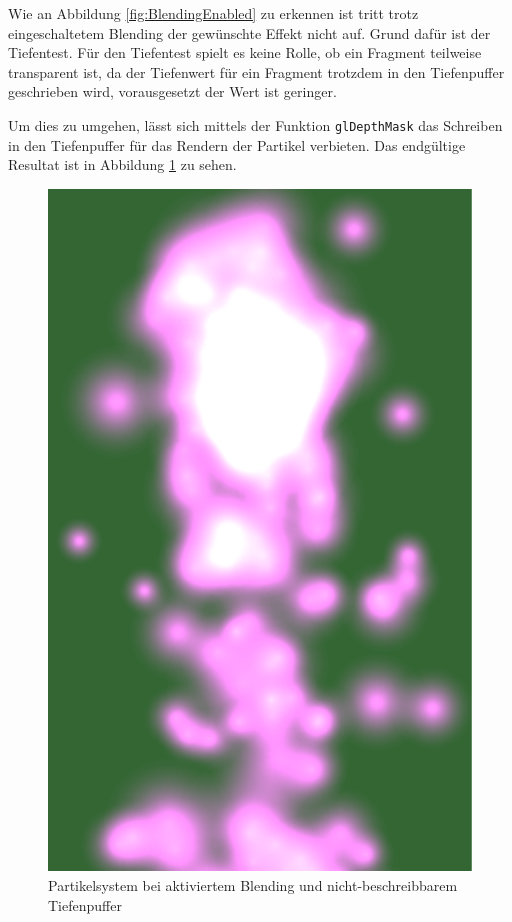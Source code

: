 Wie an Abbildung \ref{fig:BlendingEnabled} zu erkennen ist tritt trotz eingeschaltetem Blending der gewünschte Effekt nicht auf. Grund dafür ist der Tiefentest. Für den Tiefentest spielt es keine Rolle, ob ein Fragment teilweise transparent ist, da der Tiefenwert für ein Fragment trotzdem in den Tiefenpuffer geschrieben wird, vorausgesetzt der Wert ist geringer.

Um dies zu umgehen, lässt sich mittels der Funktion {\texttt{glDepthMask}} das Schreiben in den Tiefenpuffer für das Rendern der Partikel verbieten.
Das endgültige Resultat ist in Abbildung \ref{fig:ParticleFinal} zu sehen.

\begin{figure}[h]
	\centering
	\includegraphics[scale=0.4]{bilder/ParticleFinal}
	\caption{Partikelsystem bei aktiviertem Blending und nicht-beschreibbarem Tiefenpuffer}
	\label{fig:ParticleFinal}
\end{figure}
%


